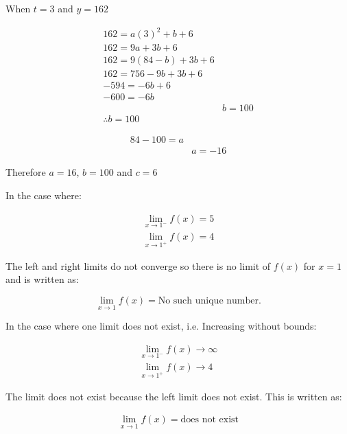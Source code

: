 \documentclass[12pt letter]{report}
\begin{document}
When $t=3$ and $y=162$

\begin{align*}
	162 = a(3)^2 + b + 6     \\
	162 = 9a + 3b + 6        \\
	162 = 9(84 - b) + 3b + 6 \\
	162 = 756 - 9b +3b +6    \\
	-594 = -6b +6            \\
	-600 = -6b               \\
	 & b = 100               \\[20pt]
	\therefore b = 100
\end{align*}

\begin{align*}
	84 - 100 = a \\
	 & a = -16
\end{align*}

Therefore $a=16$, $b=100$ and $c=6$


\noindent\large{In the case where:}

\begin{align*}
	\lim_{x\to1^-} f(x) = 5 \\
	\lim_{x\to1^+} f(x) = 4
\end{align*}

\noindent The left and right limits do not converge so there is no limit of $f(x)$ for $x = 1$ and is written as:

\[
	\lim_{x\to1} f(x) = \text{No such unique number}
	.\]
\pagebreak

\noindent\large{In the case where one limit does not exist, i.e. Increasing without bounds:}

\begin{align*}
	\lim_{x \to 1^-} f(x) \to \infty \\
	\lim_{x \to 1^+} f(x) \to 4
\end{align*}

The limit does not exist because the left limit does not exist. This is written as:

\begin{align*}
	\lim_{x\to1} f(x) = \text{does not exist} \\
\end{align*}
\end{document}
